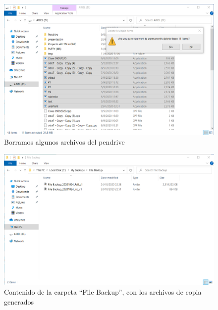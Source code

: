 \documentclass[11pt]{article}
\begin{document}
    \begin{figure}[H]
		\centering
		\includegraphics[width=.8\textwidth]{Images/easeus/pendrive/5-borrar_exe.png}
		\caption{Borramos algunos archivos del pendrive}
	\end{figure}
    
    \begin{figure}[H]
		\centering
		\includegraphics[width=.8\textwidth]{Images/easeus/pendrive/6-t2_dir_2.png}
		\caption{Contenido de la carpeta ``File Backup'', con los archivos de copia generados}
	\end{figure}
	
	\begin{figure}[H]
		\centering
		\hfill
		\vspace{7pt}
	\end{figure}
	
\end{document}
